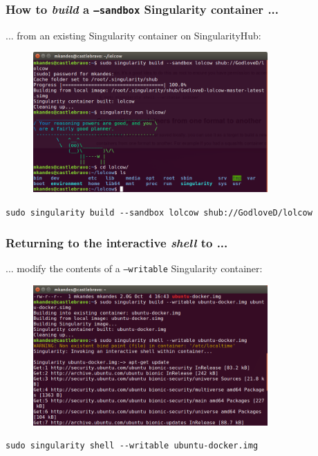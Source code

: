 \documentclass{beamer}
\begin{document}
\begin{frame}
   \frametitle{How to \textit{build} a \texttt{--sandbox} Singularity container ...}
   ... from an existing Singularity container on SingularityHub:
   \begin{figure}[htbp]
      \includegraphics[width=0.8\textwidth]{images/singularity-build-sandbox.png}
   \end{figure}
   \lstinline{sudo singularity build --sandbox lolcow shub://GodloveD/lolcow}
\end{frame}

\begin{frame}
   \frametitle{Returning to the interactive \textit{shell} to ... }
   ... modify the contents of a \texttt{--writable} Singularity container:
   \begin{figure}[htbp]
      \includegraphics[width=0.8\textwidth]{images/singularity-shell-writable-update-start.png}
   \end{figure}
   \lstinline{sudo singularity shell --writable ubuntu-docker.img}
\end{frame}
\end{document}
